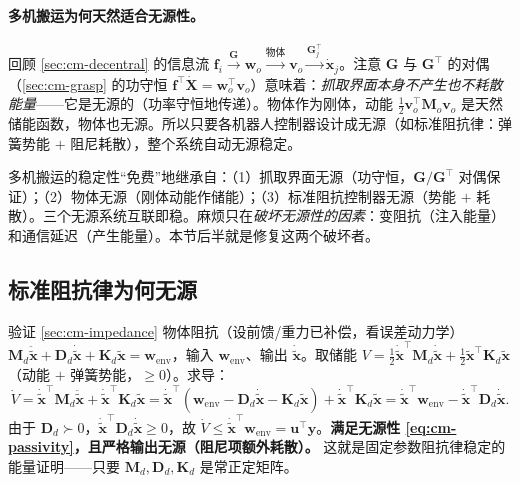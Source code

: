 \paragraph{多机搬运为何天然适合无源性。}
回顾 \cref{sec:cm-decentral} 的信息流 $\mathbf{f}_i\xrightarrow{\mathbf{G}}\mathbf{w}_o\xrightarrow{\text{物体}}\mathbf{v}_o\xrightarrow{\mathbf{G}_j^\top}\dot{\mathbf{x}}_j$。注意 $\mathbf{G}$ 与 $\mathbf{G}^\top$ 的对偶（\cref{sec:cm-grasp} 的功守恒 $\mathbf{f}^\top\dot{\mathbf{X}}=\mathbf{w}_o^\top\mathbf{v}_o$）意味着：\emph{抓取界面本身不产生也不耗散能量}——它是无源的（功率守恒地传递）。物体作为刚体，动能 $\frac12\mathbf{v}_o^\top\mathbf{M}_o\mathbf{v}_o$ 是天然储能函数，物体也无源。所以只要各机器人控制器设计成无源（如标准阻抗律：弹簧势能 $+$ 阻尼耗散），整个系统自动无源稳定。

\begin{insight}
多机搬运的稳定性“免费”地继承自：（1）抓取界面无源（功守恒，$\mathbf{G}/\mathbf{G}^\top$ 对偶保证）；（2）物体无源（刚体动能作储能）；（3）标准阻抗控制器无源（势能 $+$ 耗散）。三个无源系统互联即稳。麻烦只在\emph{破坏无源性的因素}：变阻抗（注入能量）和通信延迟（产生能量）。本节后半就是修复这两个破坏者。
\end{insight}

\subsection{标准阻抗律为何无源}
\label{sec:cm-passivity-impedance}
验证 \cref{sec:cm-impedance} 物体阻抗（设前馈/重力已补偿，看误差动力学）$\mathbf{M}_d\ddot{\tilde{\mathbf{x}}}+\mathbf{D}_d\dot{\tilde{\mathbf{x}}}+\mathbf{K}_d\tilde{\mathbf{x}}=\mathbf{w}_{\text{env}}$，输入 $\mathbf{w}_{\text{env}}$、输出 $\dot{\tilde{\mathbf{x}}}$。取储能 $V=\frac12\dot{\tilde{\mathbf{x}}}^\top\mathbf{M}_d\dot{\tilde{\mathbf{x}}}+\frac12\tilde{\mathbf{x}}^\top\mathbf{K}_d\tilde{\mathbf{x}}$（动能 $+$ 弹簧势能，$\ge 0$）。求导：
\begin{equation}
  \dot V=\dot{\tilde{\mathbf{x}}}^\top\mathbf{M}_d\ddot{\tilde{\mathbf{x}}}+\dot{\tilde{\mathbf{x}}}^\top\mathbf{K}_d\tilde{\mathbf{x}}
  =\dot{\tilde{\mathbf{x}}}^\top(\mathbf{w}_{\text{env}}-\mathbf{D}_d\dot{\tilde{\mathbf{x}}}-\mathbf{K}_d\tilde{\mathbf{x}})+\dot{\tilde{\mathbf{x}}}^\top\mathbf{K}_d\tilde{\mathbf{x}}
  =\dot{\tilde{\mathbf{x}}}^\top\mathbf{w}_{\text{env}}-\dot{\tilde{\mathbf{x}}}^\top\mathbf{D}_d\dot{\tilde{\mathbf{x}}}.
  \label{eq:cm-imp-passive}
\end{equation}
由于 $\mathbf{D}_d\succ 0$，$\dot{\tilde{\mathbf{x}}}^\top\mathbf{D}_d\dot{\tilde{\mathbf{x}}}\ge 0$，故 $\dot V\le\dot{\tilde{\mathbf{x}}}^\top\mathbf{w}_{\text{env}}=\mathbf{u}^\top\mathbf{y}$。\textbf{满足无源性 \cref{eq:cm-passivity}，且严格输出无源（阻尼项额外耗散）。} 这就是固定参数阻抗律稳定的能量证明——只要 $\mathbf{M}_d,\mathbf{D}_d,\mathbf{K}_d$ 是常正定矩阵。

